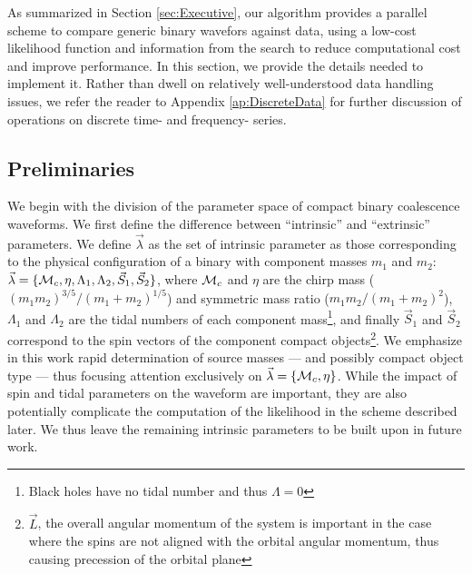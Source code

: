 \label{sec:Methods}



As summarized in Section \ref{sec:Executive}, our algorithm provides a parallel scheme to compare generic binary
wavefors against data, using a low-cost likelihood function and information from the search to reduce computational cost and
improve performance.  
%
In this section, we provide the details needed to implement it.  
%
Rather than dwell on relatively well-understood data handling issues,  we refer the reader to
Appendix \ref{ap:DiscreteData} for further discussion of operations on discrete time- and frequency- series.





\newcommand\itrprm{\vec{\lambda}}
\newcommand\etrprm{\vec{\theta}}

\subsection{Preliminaries}
We begin with the division of the parameter space of compact binary coalescence waveforms. We first define the difference between ``intrinsic'' and ``extrinsic'' parameters. We define $\itrprm$ as the set of intrinsic parameter as those corresponding to the physical configuration of a binary with component masses $m_1$ and $m_2$: $\itrprm=\{\mc,\eta,\Lambda_1,\Lambda_2,\vec{S}_1,\vec{S}_2\}$, where ${{\cal M}_c}$ and $\eta$ are the chirp mass ($(m_1m_2)^{3/5}/(m_1+m_2)^{1/5}$) and symmetric mass ratio ($m_1m_2/(m_1+m_2)^2$), $\Lambda_1$ and $\Lambda_2$ are the tidal numbers of each component mass\footnote{Black holes have no tidal number and thus $\Lambda=0$}, and finally $\vec{S}_1$ and $\vec{S}_2$ correspond to the spin vectors of the component compact objects\footnote{$\vec{L}$, the overall angular momentum of the system is important in the case where the spins are not aligned with the orbital angular momentum, thus causing precession of the orbital plane}. We emphasize in this work rapid determination of source masses --- and possibly compact object type --- thus focusing attention exclusively on $\itrprm=\{\mc,\eta\}$. While the impact of spin and tidal parameters on the waveform are important, they are also potentially complicate the computation of the likelihood in the scheme described later. We thus leave the remaining intrinsic parameters to be built upon in future work.

